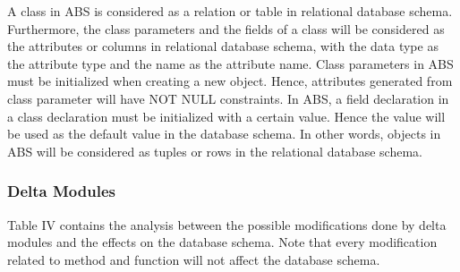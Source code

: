\documentclass[conference]{IEEEtran}
\begin{document}
A class in ABS is considered as a relation or table in relational database schema. Furthermore, the class parameters and the fields of a class will be considered as the attributes or columns in relational database schema, with the data type as the attribute type and the name as the attribute name. Class parameters in ABS must be initialized when creating a new object. Hence, attributes generated from class parameter will have NOT NULL constraints. In ABS, a field declaration in a class declaration must be initialized with a certain value. Hence the value will be used as the default value in the database schema. In other words, objects in ABS will be considered as tuples or rows in the relational database schema.

\subsubsection*{Delta Modules}
Table IV contains the analysis between the possible modifications done by delta modules and the effects on the database schema. Note that every modification related to method and function will not affect the database schema.
\end{document}
